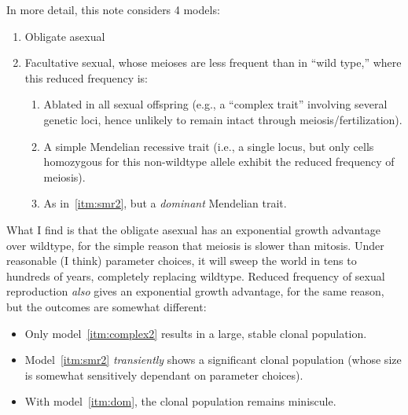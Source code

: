 \documentclass{article}\usepackage[]{graphicx}\usepackage[]{color}
\begin{document}
In more detail, this note considers 4 models:
\begin{enumerate}
  \item\label{itm:asex} Obligate asexual
  \item Facultative sexual, whose meioses are less frequent than in ``wild type,'' where this
    reduced frequency is:
    \begin{enumerate}
      \item\label{itm:complex2} Ablated in all sexual offspring (e.g., a ``complex trait'' involving
        several genetic loci, hence unlikely to remain intact through meiosis/fertilization).

      \item\label{itm:smr2} A simple Mendelian recessive trait (i.e., a single locus, but only cells
        homozygous for this non-wildtype allele exhibit the reduced frequency of meiosis).

      \item\label{itm:dom} As in~\ref{itm:smr2}, but a \textit{dominant} Mendelian trait.
    \end{enumerate}
\end{enumerate}

What I find is that the obligate asexual has an exponential growth advantage over wildtype, for the
simple reason that meiosis is slower than mitosis.  Under reasonable (I think) parameter choices, it
will sweep the world in tens to hundreds of years, completely replacing wildtype.  Reduced frequency
of sexual reproduction \textit{also} gives an exponential growth advantage, for the same reason, but
the outcomes are somewhat different:
\begin{itemize}
  \item Only model~\ref{itm:complex2} results in a large, stable clonal population.

  \item Model~\ref{itm:smr2} \textit{transiently} shows a significant clonal population (whose size
    is somewhat sensitively dependant on parameter choices).

  \item With model~\ref{itm:dom}, the clonal population remains miniscule.  
\end{itemize}
\end{document}
